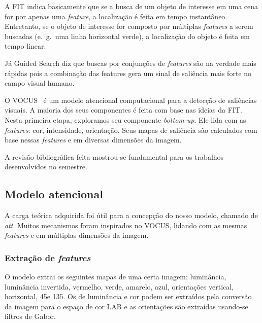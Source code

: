 \documentclass[article]{IEEEtran}
\newcommand{\tit}[1]{\textit{#1}}
\newcommand{\eg}{e.~g.~}
\begin{document}
A FIT indica basicamente que se a busca de um objeto de interesse em uma
cena for por apenas uma \tit{feature}, a localização é feita em tempo
instantâneo.
Entretanto, se o objeto de interesse for composto por múltiplas \tit{features}
a serem buscadas (\eg uma linha horizontal verde),
a localização do objeto é feita em tempo linear.

Já Guided Search diz que buscas por conjunções de \tit{features} são na
verdade mais rápidas pois a combinação das features gera um sinal de
saliência mais forte no campo visual humano.

O VOCUS~\cite{Frintrop2006} é um modelo atencional computacional
para a detecção de saliências visuais.
A maioria dos seus componentes é feita com base nas ideias da FIT\@.
Nesta primeira etapa, exploramos seu componente \tit{bottom-up}.
Ele lida com as \tit{features}: cor, intensidade, orientação.
Seus mapas de saliência são calculados com base nessas \tit{features}
e em diversas dimensões da imagem.

A revisão bibliográfica feita mostrou-se fundamental para os trabalhos
desenvolvidos no semestre.

\subsection{Modelo atencional}
A carga teórica adquirida foi útil para a concepção do nosso modelo,
chamado de \tit{att}.
Muitos mecanismos foram inspirados no VOCUS, lidando com as mesmas
\tit{features} e em múltiplas dimensões da imagem.

\subsubsection{Extração de \tit{features}}
O modelo extrai os seguintes mapas de uma certa imagem:
luminância, luminância invertida, vermelho, verde, amarelo, azul,
orientações vertical, horizontal, 45\degree e 135\degree.
Os de luminância e cor podem ser extraídos pela conversão da imagem para o
espaço de cor LAB e as orientações são extraídas usando-se filtros de Gabor.
\end{document}
